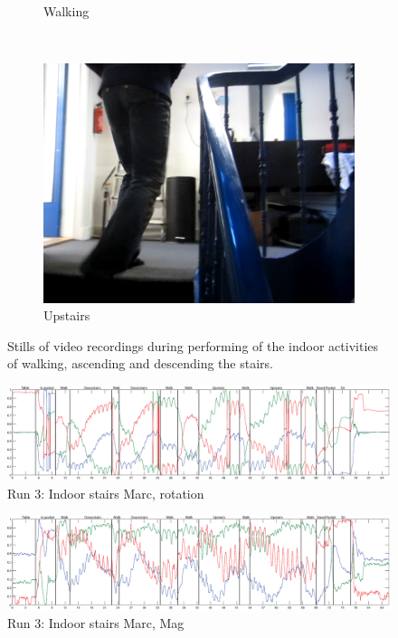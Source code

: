 \begin{figure}
\begin{subfigure}[b]{0.3\textwidth}
    \caption{Walking}
    \label{fig:stills_subject_3_walking}
  \end{subfigure}
  ~
  \begin{subfigure}[b]{0.3\textwidth}
    \includegraphics[width=\textwidth]{./Figures/chapter6/data_collection/stills/marc_stairs_up_walk.png}
    \caption{Upstairs}
    \label{fig:stills_subject_3_upstairs}
  \end{subfigure}
  \caption[Stills subject 3]{Stills of video recordings during performing of the indoor activities of walking, ascending and descending the stairs.}\label{fig:stills_subject_3}
\end{figure}

\begin{figure}
\centering
  \includegraphics[width=1\textwidth]{./Figures/chapter6/data_collection/stairs-1-marc/data_plot_rot_annotated.eps}
  \caption[R3: rotation]{Run 3: Indoor stairs Marc, rotation}
  \label{fig:data_gathering_run_3_rot}
\end{figure}

\begin{figure}
\centering
  \includegraphics[width=1\textwidth]{./Figures/chapter6/data_collection/stairs-1-marc/data_plot_mag_annotated.eps}
  \caption[R3: mag]{Run 3: Indoor stairs Marc, Mag}
  \label{fig:data_gathering_run_3_mag}
\end{figure}

